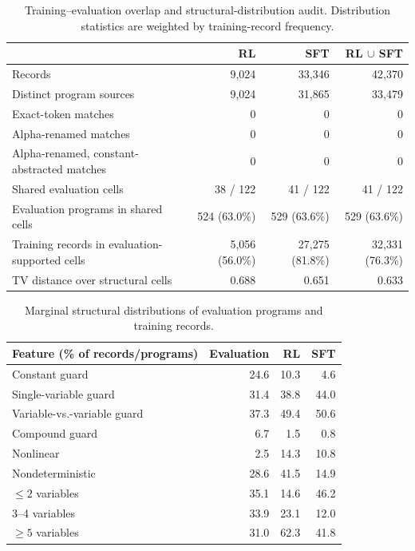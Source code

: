 \begin{table}[H]
\centering
\begin{tabular}{lrrr}
\toprule
\rowcolor{algobg}
 & RL & SFT & RL \(\cup\) SFT \\
\midrule
Records & 9,024 & 33,346 & 42,370 \\
Distinct program sources & 9,024 & 31,865 & 33,479 \\
Exact-token matches & 0 & 0 & 0 \\
Alpha-renamed matches & 0 & 0 & 0 \\
Alpha-renamed, constant-abstracted matches & 0 & 0 & 0 \\
Shared evaluation cells & 38 / 122 & 41 / 122 & 41 / 122 \\
Evaluation programs in shared cells & 524 (63.0\%) & 529 (63.6\%) & 529 (63.6\%) \\
Training records in evaluation-supported cells & 5,056 (56.0\%) & 27,275 (81.8\%) & 32,331 (76.3\%) \\
TV distance over structural cells & 0.688 & 0.651 & 0.633 \\
\bottomrule
\end{tabular}
\caption{Training--evaluation overlap and structural-distribution audit. Distribution statistics are weighted by training-record frequency.}
\label{tab:train-test-leakage}
\end{table}

\begin{table}[H]
\centering
\begin{tabular}{lrrr}
\toprule
\rowcolor{algobg}
Feature (\% of records/programs) & Evaluation & RL & SFT \\
\midrule
Constant guard & 24.6 & 10.3 & 4.6 \\
Single-variable guard & 31.4 & 38.8 & 44.0 \\
Variable-vs.-variable guard & 37.3 & 49.4 & 50.6 \\
Compound guard & 6.7 & 1.5 & 0.8 \\
Nonlinear & 2.5 & 14.3 & 10.8 \\
Nondeterministic & 28.6 & 41.5 & 14.9 \\
\(\leq 2\) variables & 35.1 & 14.6 & 46.2 \\
3--4 variables & 33.9 & 23.1 & 12.0 \\
\(\geq 5\) variables & 31.0 & 62.3 & 41.8 \\
\bottomrule
\end{tabular}
\caption{Marginal structural distributions of evaluation programs and training records.}
\label{tab:train-test-marginals}
\end{table}

